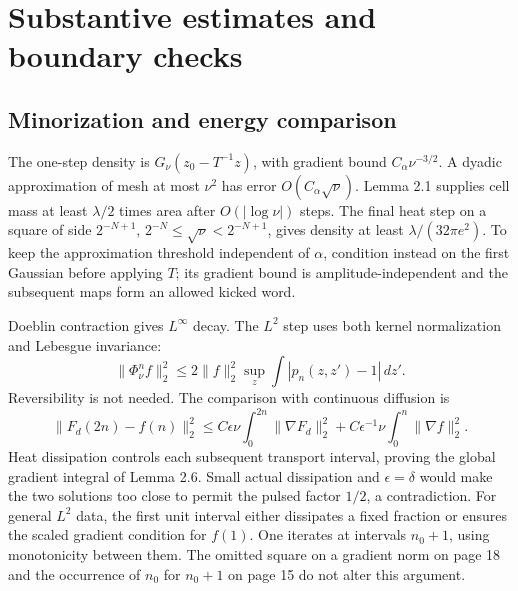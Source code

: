 \documentclass[10pt]{article}
\begin{document}
\section*{Substantive estimates and boundary checks}
\subsection*{Minorization and energy comparison}
The one-step density is \(G_\nu(z_0-T^{-1}z)\), with gradient bound \(C_\alpha\nu^{-3/2}\). A dyadic approximation of mesh at most \(\nu^2\) has error \(O(C_\alpha\sqrt\nu)\). Lemma 2.1 supplies cell mass at least \(\lambda/2\) times area after \(O(|\log\nu|)\) steps. The final heat step on a square of side \(2^{-N+1}\), \(2^{-N}\le\sqrt\nu<2^{-N+1}\), gives density at least \(\lambda/(32\pi e^2)\). To keep the approximation threshold independent of \(\alpha\), condition instead on the first Gaussian before applying \(T\); its gradient bound is amplitude-independent and the subsequent maps form an allowed kicked word.\par
Doeblin contraction gives \(L^\infty\) decay. The \(L^2\) step uses both kernel normalization and Lebesgue invariance: \[\|\Phi_\nu^nf\|_2^2\le
 2\|f\|_2^2\sup_z\int|p_n(z,z')-1|\,dz'.\] Reversibility is not needed. The comparison with continuous diffusion is \[\|F_d(2n)-f(n)\|_2^2\le
 C\epsilon\nu\int_0^{2n}\|\nabla F_d\|_2^2+
 C\epsilon^{-1}\nu\int_0^n\|\nabla f\|_2^2.\] Heat dissipation controls each subsequent transport interval, proving the global gradient integral of Lemma 2.6. Small actual dissipation and \(\epsilon=\delta\) would make the two solutions too close to permit the pulsed factor \(1/2\), a contradiction. For general \(L^2\) data, the first unit interval either dissipates a fixed fraction or ensures the scaled gradient condition for \(f(1)\). One iterates at intervals \(n_0+1\), using monotonicity between them. The omitted square on a gradient norm on page 18 and the occurrence of \(n_0\) for \(n_0+1\) on page 15 do not alter this argument.\par
\end{document}
